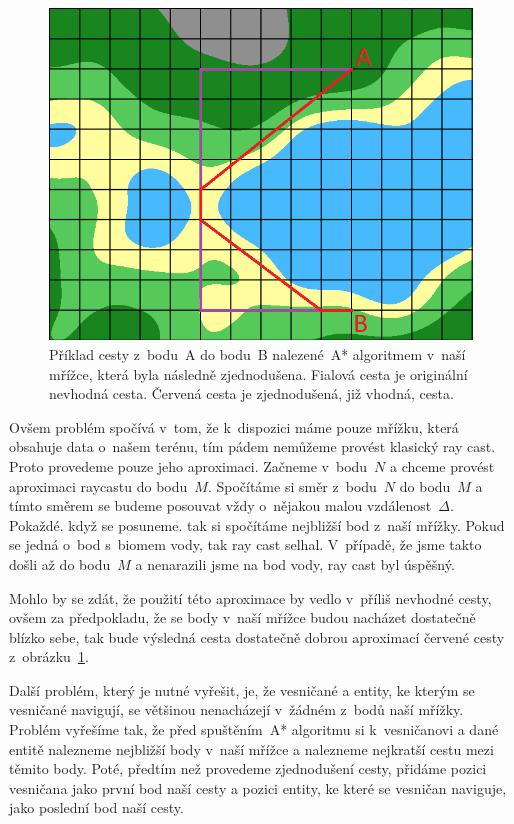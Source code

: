 \begin{figure}[!htb]
    \centering
    \includegraphics[width=0.66\linewidth]{img/path_simplified.png}
    \caption{Příklad cesty z~bodu~A do bodu~B nalezené~A* algoritmem v~naší mřížce, která byla následně zjednodušena. Fialová cesta je originální nevhodná cesta. Červená cesta je zjednodušená, již vhodná, cesta.}
    \label{fig:path_simplified}
\end{figure}

Ovšem problém spočívá v~tom, že k~dispozici máme pouze mřížku, která obsahuje data o~našem terénu, tím pádem nemůžeme provést klasický ray cast. Proto provedeme pouze jeho aproximaci. Začneme v~bodu~$N$ a chceme provést aproximaci raycastu do bodu~$M$. Spočítáme si směr z~bodu~$N$ do bodu~$M$ a tímto směrem se budeme posouvat vždy o~nějakou malou vzdálenost~$\Delta$. Pokaždé. když se posuneme. tak si spočítáme nejbližší bod z~naší mřížky. Pokud se jedná o~bod s~biomem vody, tak ray cast selhal. V~případě, že jsme takto došli až do bodu~$M$ a nenarazili jsme na bod vody, ray cast byl úspěšný.

Mohlo by se zdát, že použití této aproximace by vedlo v~příliš nevhodné cesty, ovšem za předpokladu, že se body v~naší mřížce budou nacházet dostatečně blízko sebe, tak bude výsledná cesta dostatečně dobrou aproximací červené cesty z~obrázku~\ref{fig:path_simplified}.

Další problém, který je nutné vyřešit, je, že vesničané a entity, ke kterým se vesničané navigují, se většinou nenacházejí v~žádném z~bodů naší mřížky. Problém vyřešíme tak, že před spuštěním~A* algoritmu si k~vesničanovi a dané entitě nalezneme nejbližší body v~naší mřížce a nalezneme nejkratší cestu mezi těmito body. Poté, předtím než provedeme zjednodušení cesty, přidáme pozici vesničana jako první bod naší cesty a pozici entity, ke které se vesničan naviguje, jako poslední bod naší cesty.

